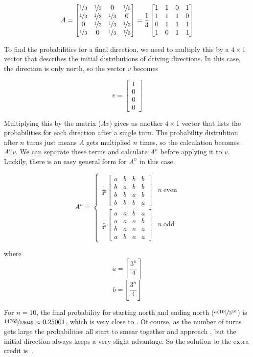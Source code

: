\documentclass{article}
\begin{document}
\[
A=
\begin{bmatrix}
\nicefrac{1}{3} & \nicefrac{1}{3} & 0 & \nicefrac{1}{3} \\
\nicefrac{1}{3} & \nicefrac{1}{3} & \nicefrac{1}{3} & 0 \\
0 & \nicefrac{1}{3} & \nicefrac{1}{3} & \nicefrac{1}{3} \\
\nicefrac{1}{3} & 0 & \nicefrac{1}{3} & \nicefrac{1}{3} 
\end{bmatrix}
= \frac{1}{3}
\begin{bmatrix}
1 & 1 & 0 & 1 \\
1 & 1 & 1 & 0 \\
0 & 1 & 1 & 1 \\
1 & 0 & 1 & 1
\end{bmatrix}
\]

To find the probabilities for a final direction, we need to multiply this by a $4\times1$ vector that describes the initial distributions of driving directions.
In this case, the direction is only north, so the vector $v$ becomes

\[
v=
\begin{bmatrix}
1 \\
0 \\
0 \\
0
\end{bmatrix}
\]

Multiplying this by the matrix ($Av$) gives us another $4\times1$ vector that lists the probabilities for each direction after a single turn.
The probability distrubtion after $n$ turns just means $A$ gets multiplied $n$ times, so the calculation becomes $A^{n}v$.
We can separate these terms and calculate $A^{n}$ before applying it to $v$.
Luckily, there is an easy general form for $A^{n}$ in this case.

\[
A^{n}=
\begin{cases}
\frac{1}{3^{n}}
\begin{bmatrix}
a & b & b & b \\
b & a & b & b \\
b & b & a & b \\
b & b & b & a
\end{bmatrix} & n\ \mathrm{even} \\
\frac{1}{3^{n}}
\begin{bmatrix}
a & a & b & a \\
a & a & a & b \\
b & a & a & a \\
a & b & a & a
\end{bmatrix} & n\ \mathrm{odd}
\end{cases}
\]

where
\[
a=\left\lceil \frac{3^{n}}{4}\right\rceil
\]
\[
b=\left\lfloor \frac{3^{n}}{4}\right\rfloor
\]

For $n=10$, the final probability for starting north and ending north ($\nicefrac{a(10)}{3^{10}}$) is $\nicefrac{14763}{59049}\approx0.25001$, which is very close to .
Of course, as the number of turns gets large the probabilities all start to smear together and approach , but the initial direction always keeps a very slight advantage.
So the solution to the extra credit is
\,.
\end{document}

